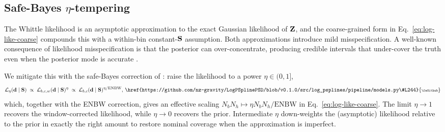 \documentclass[%
	reprint,
	nofootinbib,
	amsmath,
	amssymb,
	aps,
]{revtex4-2}
\DeclareRobustCommand{\codelink}[1]{\,\href{#1}{\mbox{\scalebox{0.65}{\faGithub}}}}
\renewcommand{\d}{{\bf d}}
\renewcommand{\S}{{\bf S}}
\newcommand{\Z}{{\bf Z}}
\begin{document}
	\subsection{Safe-Bayes $\eta$-tempering}
	\label{subsec:eta}
	The Whittle likelihood is an asymptotic approximation to the exact Gaussian
	likelihood of $\Z$, and the coarse-grained form in
	Eq.~\eqref{eq:log-like-coarse} compounds this with a within-bin
	constant-$\S$ assumption. Both approximations introduce mild
	misspecification. A well-known consequence of likelihood misspecification is
	that the posterior can over-concentrate, producing credible intervals that
	under-cover the truth even when the posterior mode is accurate
	\citep{grunwald2019}.

	We mitigate this with the safe-Bayes correction of
	\citet{grunwald2019}: raise the likelihood to a power $\eta\in(0,1]$,
	\begin{equation}
		\label{eq:eta-tempered}
		\mathcal{L}_{\eta}(\d\mid\S)
		\;\propto\; \mathcal{L}_{b,c,w}(\d\mid\S)^{\eta}
		\;\propto\; \mathcal{L}_{b,c}(\d\mid\S)^{\eta/\mathrm{ENBW}},
		\codelink{https://github.com/nz-gravity/LogPSplinePSD/blob/v0.1.0/src/log_psplines/pipeline/models.py\#L244}
	\end{equation}
	which, together with the ENBW correction, gives an effective scaling
	$N_{b}N_{h}\mapsto \eta N_{b}N_{h}/\mathrm{ENBW}$ in
	Eq.~\eqref{eq:log-like-coarse}. The limit $\eta\to 1$ recovers the
	window-corrected likelihood, while $\eta\to 0$ recovers the prior. Intermediate
	$\eta$ down-weights the (asymptotic) likelihood relative to the prior in
	exactly the right amount to restore nominal coverage when the
	approximation is imperfect.
\end{document}
